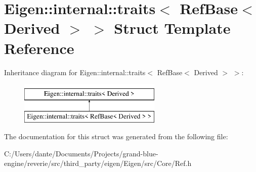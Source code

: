 \hypertarget{struct_eigen_1_1internal_1_1traits_3_01_ref_base_3_01_derived_01_4_01_4}{}\section{Eigen\+::internal\+::traits$<$ Ref\+Base$<$ Derived $>$ $>$ Struct Template Reference}
\label{struct_eigen_1_1internal_1_1traits_3_01_ref_base_3_01_derived_01_4_01_4}
Inheritance diagram for Eigen\+::internal\+::traits$<$ Ref\+Base$<$ Derived $>$ $>$\+:\begin{figure}[H]
\begin{center}
\leavevmode
\includegraphics[height=2.000000cm]{struct_eigen_1_1internal_1_1traits_3_01_ref_base_3_01_derived_01_4_01_4}
\end{center}
\end{figure}


The documentation for this struct was generated from the following file\+:\begin{DoxyCompactItemize}
\item 
C\+:/\+Users/dante/\+Documents/\+Projects/grand-\/blue-\/engine/reverie/src/third\+\_\+party/eigen/\+Eigen/src/\+Core/Ref.\+h\end{DoxyCompactItemize}
